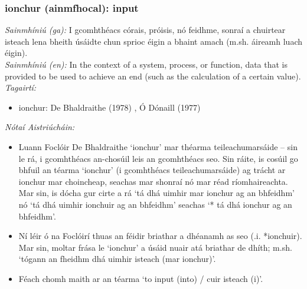 \subsubsection*{ionchur (ainmfhocal): input}
 \noindent \textit{Sainmhíniú (ga):} I gcomhthéacs córais, próisis, nó feidhme, sonraí a chuirtear isteach lena bheith úsáidte chun sprioc éigin a bhaint amach (m.sh. áireamh luach éigin).
\\
 \noindent \textit{Sainmhíniú (en):} In the context of a system, process, or function, data that is provided to be used to achieve an end (such as the calculation of a certain value).
\\
 \noindent \textit{Tagairtí:}
\begin{itemize}
	\item ionchur: De Bhaldraithe (1978) \cite{de-bhaldraithe}, Ó Dónaill (1977) \cite{odonaill}
\end{itemize}

 \noindent \textit{Nótaí Aistriúcháin:}
\begin{itemize}
	\item Luann Foclóir De Bhaldraithe `ionchur' mar théarma teileachumarsáide -- sin le rá, i gcomhthéacs an-chosúil leis an gcomhthéacs seo. Sin ráite, is cosúil go bhfuil an téarma `ionchur' (i gcomhthéacs teileachumarsáide) ag trácht ar ionchur mar choincheap, seachas mar shonraí nó mar réad ríomhaireachta. Mar sin, is dócha gur cirte a rá `tá dhá uimhir mar ionchur ag an bhfeidhm' nó `tá dhá uimhir ionchuir ag an bhfeidhm' seachas `* tá dhá ionchur ag an bhfeidhm'.
	\item Ní léir ó na Foclóirí thuas an féidir briathar a dhéanamh as seo (.i. *ionchuir). Mar sin, moltar frása le `ionchur' a úsáid nuair atá briathar de dhíth; m.sh. `tógann an fheidhm dhá uimhir isteach (mar ionchur)'.
	\item Féach chomh maith ar an téarma `to input (into) / cuir isteach (i)'.
\end{itemize}


